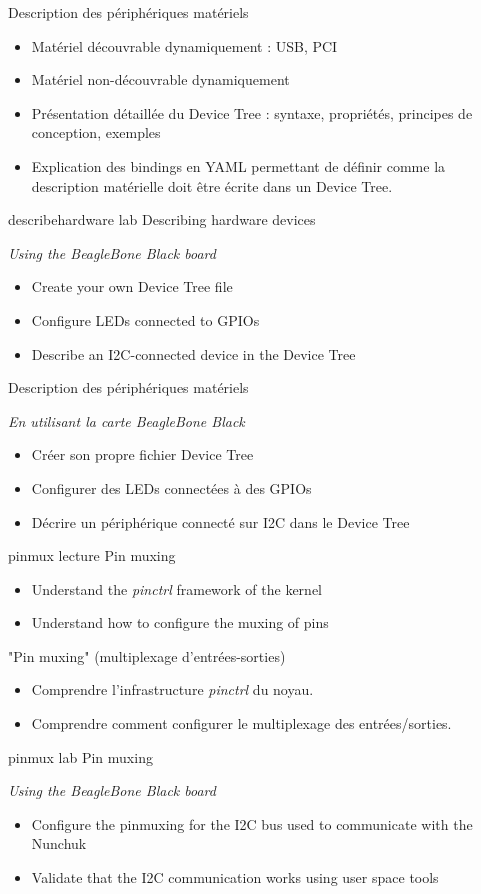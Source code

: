 {Description des périphériques matériels}
{
  \begin{itemize}
  \item Matériel découvrable dynamiquement : USB, PCI
  \item Matériel non-découvrable dynamiquement
  \item Présentation détaillée du Device Tree : syntaxe, propriétés,
    principes de conception, exemples
  \item Explication des bindings en YAML permettant de définir comme la
    description matérielle doit être écrite dans un Device Tree.
  \end{itemize}
}
{describehardware}
{lab}
{Describing hardware devices}
{
  {\em Using the BeagleBone Black board}
  \begin{itemize}
  \item Create your own Device Tree file
  \item Configure LEDs connected to GPIOs
  \item Describe an I2C-connected device in the Device Tree
  \end{itemize}
}
{Description des périphériques matériels}
{
  {\em En utilisant la carte BeagleBone Black}
  \begin{itemize}
  \item Créer son propre fichier Device Tree
  \item Configurer des LEDs connectées à des GPIOs
  \item Décrire un périphérique connecté sur I2C dans le Device Tree
  \end{itemize}
}
{pinmux}
{lecture}
{Pin muxing}
{
  \begin{itemize}
  \item Understand the {\em pinctrl} framework of the kernel
  \item Understand how to configure the muxing of pins
  \end{itemize}
}
{"Pin muxing" (multiplexage d'entrées-sorties)}
{
  \begin{itemize}
  \item Comprendre l'infrastructure {\em pinctrl} du noyau.
  \item Comprendre comment configurer le multiplexage des
    entrées/sorties.
  \end{itemize}
}
{pinmux}
{lab}
{Pin muxing}
{
  {\em Using the BeagleBone Black board}
  \begin{itemize}
  \item Configure the pinmuxing for the I2C bus used to communicate
    with the Nunchuk
  \item Validate that the I2C communication works using user space
    tools
  \end{itemize}
}
